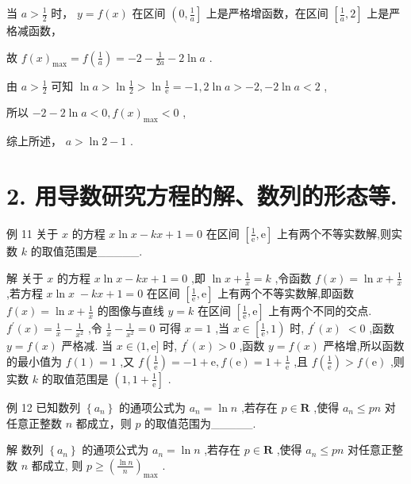 \documentclass[10pt]{article}
\newcommand*\circled[1]{\tikz[baseline=(char.base)]{\node[shape=circle,draw,inner sep=1.5pt] (char) {\small #1};}}
\begin{document}
 \circled{2}  当 \(a > \frac{1}{2}\) 时， \(y = f\left( x\right)\) 在区间 \(\left( {0,\frac{1}{a}}\right\rbrack\) 上是严格增函数，在区间 \(\left\lbrack  {\frac{1}{a},2}\right\rbrack\) 上是严格减函数，

故 \(f{\left( x\right) }_{\max } = f\left( \frac{1}{a}\right)  =  - 2 - \frac{1}{2a} - 2\ln a\) .

由 \(a > \frac{1}{2}\) 可知 \(\ln a > \ln \frac{1}{2} > \ln \frac{1}{\mathrm{e}} =  - 1,2\ln a >  - 2, - 2\ln a < 2\) ,

所以 \(- 2 - 2\ln a < 0,f{\left( x\right) }_{\max } < 0\) ,

综上所述， \(a > \ln 2 - 1\) .

\section*{2. 用导数研究方程的解、数列的形态等.}

例 11 关于 \(x\) 的方程 \(x\ln x - {kx} + 1 = 0\) 在区间 \(\left\lbrack  {\frac{1}{\mathrm{e}},\mathrm{e}}\right\rbrack\) 上有两个不等实数解,则实数 \(k\) 的取值范围是\_\_\_\_\_.

解 关于 \(x\) 的方程 \(x\ln x - {kx} + 1 = 0\) ,即 \(\ln x + \frac{1}{x} = k\) ,令函数 \(f\left( x\right)  = \ln x + \frac{1}{x}\) ,若方程 \(x\ln x \; - {kx} + 1 = 0\) 在区间 \(\left\lbrack  {\frac{1}{\mathrm{e}},\mathrm{e}}\right\rbrack\) 上有两个不等实数解,即函数 \(f\left( x\right)  = \ln x + \frac{1}{x}\) 的图像与直线 \(y = k\) 在区间 \(\left\lbrack  {\frac{1}{\mathrm{e}},\mathrm{e}}\right\rbrack\) 上有两个不同的交点. \({f}^{\prime }\left( x\right)  = \frac{1}{x} - \frac{1}{{x}^{2}}\) ,令 \(\frac{1}{x} - \frac{1}{{x}^{2}} = 0\) 可得 \(x = 1\) ,当 \(x \in  \left\lbrack  {\frac{1}{\mathrm{e}},1}\right)\) 时, \({f}^{\prime }\left( x\right) \; < 0\) ,函数 \(y = f\left( x\right)\) 严格减. 当 \(x \in  (1,\mathrm{e}\rbrack\) 时, \({f}^{\prime }\left( x\right)  > 0\) ,函数 \(y = f\left( x\right)\) 严格增,所以函数的最小值为 \(f\left( 1\right)  = 1\) ,又 \(f\left( \frac{1}{\mathrm{e}}\right)  =  - 1 + \mathrm{e},f\left( \mathrm{e}\right)  = 1 + \frac{1}{\mathrm{e}}\) ,且 \(f\left( \frac{1}{\mathrm{e}}\right)  > f\left( \mathrm{e}\right)\) ,则实数 \(k\) 的取值范围是 \(\left( {1,1 + \frac{1}{\mathrm{e}}}\right\rbrack\) .

例 12 已知数列 \(\left\{  {a}_{n}\right\}\) 的通项公式为 \({a}_{n} = \ln n\) ,若存在 \(p \in  \mathbf{R}\) ,使得 \({a}_{n} \leq  {pn}\) 对任意正整数 \(n\) 都成立，则 \(p\) 的取值范围为\_\_\_\_\_.

解 数列 \(\left\{  {a}_{n}\right\}\) 的通项公式为 \({a}_{n} = \ln n\) ,若存在 \(p \in  \mathbf{R}\) ,使得 \({a}_{n} \leq  {pn}\) 对任意正整数 \(n\) 都成立, 则 \(p \geq  {\left( \frac{\ln n}{n}\right) }_{\max }\) .
\end{document}

